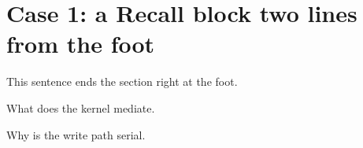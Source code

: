 %
%
%

\newcommand{\fixturefilltofoot}[1]{\vspace*{\dimexpr\textheight-#1\baselineskip\relax}}

\section*{Case 1: a Recall block two lines from the foot}
\fixturefilltofoot{2}
\noindent This sentence ends the section right at the foot.
\begin{pdrecitation}
  \item What does the kernel mediate.
  \item Why is the write path serial.
\end{pdrecitation}

